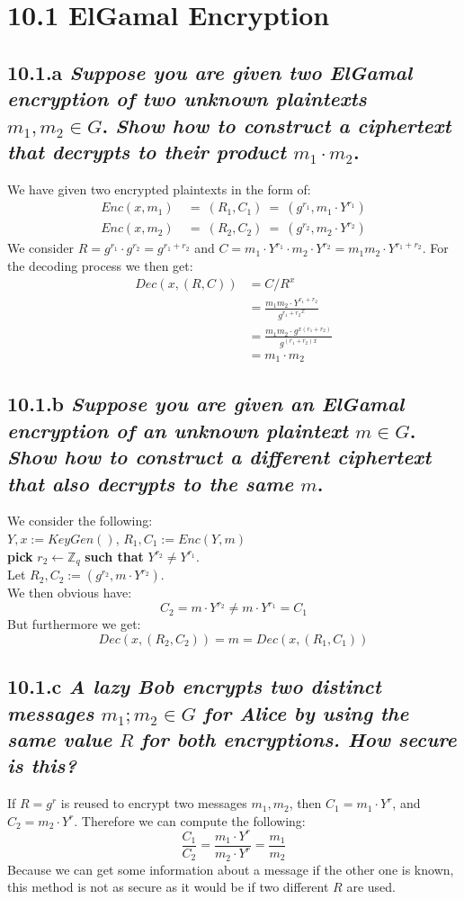 \documentclass{report}
\begin{document}
	\pagestyle{fancy}
	
	\section*{10.1 ElGamal Encryption}
		\subsection*{10.1.a \textit{Suppose you are given two ElGamal encryption of two unknown plaintexts} $m_1 , m_2 \in G$. \textit{Show how to construct a ciphertext that decrypts to their product} $m_1 \cdot m_2$.}
			We have given two encrypted plaintexts in the form of:
			\begin{align*}
				Enc(x, m_1) \ & =  \ (R_1, C_1) \ = \ (g^{r_1} , m_1 \cdot Y^{r_1}) \\
				Enc(x, m_2) \ & =  \ (R_2, C_2) \ = \ (g^{r_2} , m_2 \cdot Y^{r_2})
			\end{align*}
			We consider $R = g^{r_1} \cdot g^{r_2} = g^{r_1 + r_2}$ and $C = m_1 \cdot Y^{r_1} \cdot m_2 \cdot Y^{r_2} = m_1 m_2 \cdot Y^{r_1 + r_2}$. For the decoding process we then get:
			\begin{align*}
  				Dec(x, (R, C)) & = C / R^x \\
                & = \frac{m_1 m_2 \cdot Y^{r_1 + r_2}}{{g^{r_1 + r_2}}^{x}} \\
                & = \frac{m_1 m_2 \cdot g^{x (r_1 + r_2)}}{g^{(r_1 + r_2)x}} \\
                & = m_1 \cdot m_2
			\end{align*}
		\subsection*{10.1.b \textit{Suppose you are given an ElGamal encryption of an unknown plaintext} $m \in G$. \textit{Show how to construct a different ciphertext that also decrypts to the same} $m$.}
			We consider the following: \\
			$Y, x := KeyGen()$, $R_1, C_1 := Enc(Y, m)$ \\
			\textbf{pick} $r_2 \leftarrow \mathbb{Z}_q$ \textbf{such that} $Y^{r_2} \neq Y^{r_1}$. \\
			Let $R_2, C_2 := (g^{r_2}, m \cdot Y^{r_2})$. \\
			We then obvious have:
			\[
 				 C_2 = m \cdot Y^{r_2} \neq m \cdot Y^{r_1} = C_1
			\]
			But furthermore we get:
			\[
  				Dec(x, (R_2, C_2)) = m = Dec(x, (R_1, C_1))
			\]
		\subsection*{10.1.c \textit{A lazy Bob encrypts two distinct messages} $m_1;m_2 \in G$ \textit{for Alice by using the same value} $R$ \textit{for both encryptions. How secure is this?}}
			If $R = g^r$ is reused to encrypt two messages $m_1, m_2$, then $C_1 = m_1 \cdot Y^r$, and $C_2 = m_2 \cdot Y^r$. Therefore we can compute the following:
			\[
  				\frac{C_1}{C_2} = \frac{m_1 \cdot Y^r}{m_2 \cdot Y^r} = \frac{m_1}{m_2}
			\]
			Because we can get some information about a message if the other one is known, this method is not as secure as it would be if two different $R$ are used.
\end{document}
